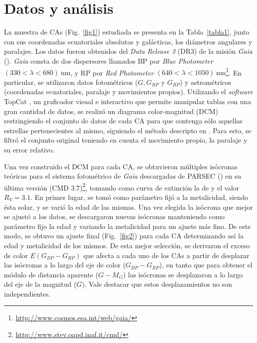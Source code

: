 \documentclass[baaa]{baaa}
\begin{document}
\section{Datos y análisis}
La muestra de CAs (Fig.~\ref{fig1}) estudiada se presenta en la Tabla~\ref{tabla1}, junto con sus coordenadas ecuatoriales absolutas y gal\'acticas, los di\'ametros angulares y paralajes. Los datos fueron obtenidos del {\em Data Release 3} (DR3) \citep{G23} de la misi\'on {\sl Gaia} (\citep{G16}). {\sl Gaia} consta de dos dispersores llamados BP por {\em Blue Photometer} $(330 < \lambda < 680)~\mathrm{nm}$, y RP por {\em Red Photometer} $(640 < \lambda < 1050)~\mathrm{nm}$\footnote{\url{http://www.cosmos.esa.int/web/gaia/}}. En particular, se utilizaron datos fotom\'etricos ($G, G_{BP}$ y $G_{RP}$) y astrom\'etricos (coordenadas ecuatoriales, paralaje y movimientos propios). Utilizando el {\em software} {\sc TopCat} \citep{T05}, un graficador visual e interactivo que permite manipular tablas con una gran cantidad de datos, se realiz\'o un diagrama color-magnitud (DCM) restringiendo el conjunto de datos de cada CA para que contenga s\'olo aquellas estrellas pertenecientes al mismo, siguiendo el m\'etodo descripto en \cite{B23}. Para esto, se filtr\'o el conjunto original teniendo en cuenta el movimiento propio, la paralaje y su error relativo.

Una vez construido el DCM para cada CA, se obtuvieron m\'ultiples is\'ocronas te\'oricas para el sistema fotom\'etrico de {\sl Gaia} descargadas de PARSEC (\citep{B12}) en su \'ultima versi\'on (CMD 3.7)\footnote{\url{http://www.stev.oapd.inaf.it/cmd/}}, tomando como curva de extinción la de \cite{ccm1989} y el valor $R_V = 3.1$. En primer lugar, se tom\'o como par\'ametro fij\'o a la metalicidad, siendo \'esta solar, y se vari\'o la edad de las mismas. Una vez elegida la is\'ocrona que mejor se ajust\'o a los datos, se descargaron nuevas is\'ocronas manteniendo como par\'ametro fijo la edad y variando la metalicidad para un ajuste m\'as fino. De este modo, se obtuvo un ajuste final (Fig.~\ref{fig2}) para cada CA determinando as\'i la edad y metalicidad de los mismos. De esta mejor selección, se derivaron el exceso de color $E(G_{BP}-G_{RP})$ que afecta a cada uno de los CAs a partir de desplazar las isócronas a lo largo del eje de color ($G_{BP}-G_{RP}$), en tanto que para obtener el módulo de distancia aparente ($G-M_G$) las isócronas se desplazaron a lo largo del eje de la magnitud ($G$). Vale destacar que estos desplazamientos no son independientes.
\end{document}

